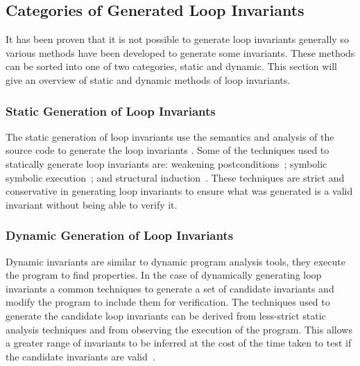 \subsection{Categories of Generated Loop Invariants}

It has been proven that it is not possible to generate loop invariants
generally 
so various methods have been developed to generate some invariants.
These methods can be sorted into one of two categories, static and dynamic.
This section will give an overview of static and dynamic methods of loop
invariants.

\subsubsection{Static Generation of Loop Invariants}

The static generation of loop invariants use the
semantics and analysis of the source code to generate the loop invariants
\cite{java-static-symb}.
Some of the techniques used to statically generate loop invariants are:
weakening postconditions~\cite{infer-postconditions};  symbolic symbolic
execution~\cite{java-static-symb}; and structural
induction~\cite{struct-induction}.
These techniques are strict and conservative in generating loop invariants
to ensure what was generated is a valid invariant without being able to
verify it.



\subsubsection{Dynamic Generation of Loop Invariants}

Dynamic invariants are similar to dynamic program analysis
tools, they execute the program to find properties.
In the case of dynamically generating loop invariants a
common techniques to generate a set of candidate invariants
and modify the program to include them for verification.
The techniques used to generate the candidate loop invariants
can be derived from less-strict static analysis techniques and
from observing the execution of the program.
This allows a greater range of invariants to be inferred at
the cost of the time taken to test if the candidate invariants are
valid~\cite{infer-dynamic}\cite{infer-postconditions}.


